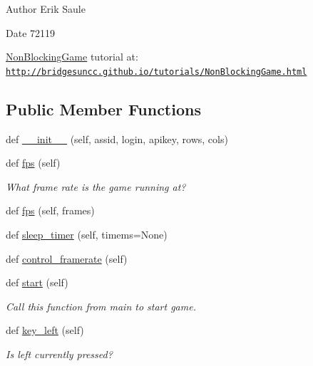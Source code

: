 \begin{DoxyAuthor}{Author}
Erik Saule 
\end{DoxyAuthor}
\begin{DoxyDate}{Date}
72119
\end{DoxyDate}
\hyperlink{classbridges_1_1non__blocking__game_1_1_non_blocking_game}{Non\+Blocking\+Game} tutorial at\+: \href{http://bridgesuncc.github.io/tutorials/NonBlockingGame.html}{\tt http\+://bridgesuncc.\+github.\+io/tutorials/\+Non\+Blocking\+Game.\+html} \subsection*{Public Member Functions}
\begin{DoxyCompactItemize}
\item 
def \hyperlink{classbridges_1_1non__blocking__game_1_1_non_blocking_game_aded027939d7461e5b8e04a1cd5554a66}{\+\_\+\+\_\+init\+\_\+\+\_\+} (self, assid, login, apikey, rows, cols)
\item 
def \hyperlink{classbridges_1_1non__blocking__game_1_1_non_blocking_game_a5763c5a20f130943cec948a9f42803a0}{fps} (self)
\begin{DoxyCompactList}\small\item\em What frame rate is the game running at? \end{DoxyCompactList}\item 
def \hyperlink{classbridges_1_1non__blocking__game_1_1_non_blocking_game_a46b4b4a25c7c7ffc78126a7b693b7ceb}{fps} (self, frames)
\item 
def \hyperlink{classbridges_1_1non__blocking__game_1_1_non_blocking_game_a2e4dca6a290c65472200e69012e01d16}{sleep\+\_\+timer} (self, timems=None)
\item 
def \hyperlink{classbridges_1_1non__blocking__game_1_1_non_blocking_game_ad751eeccbf14adc09f9c11acce3757c9}{control\+\_\+framerate} (self)
\item 
def \hyperlink{classbridges_1_1non__blocking__game_1_1_non_blocking_game_ad6e23c265e1b710114459f0b666d25cb}{start} (self)
\begin{DoxyCompactList}\small\item\em Call this function from main to start game. \end{DoxyCompactList}\item 
def \hyperlink{classbridges_1_1non__blocking__game_1_1_non_blocking_game_a87490ef28d161f22e753aab5d3e67e46}{key\+\_\+left} (self)
\begin{DoxyCompactList}\small\item\em Is left currently pressed? \end{DoxyCompactList}\item 

\end{DoxyCompactItemize}
